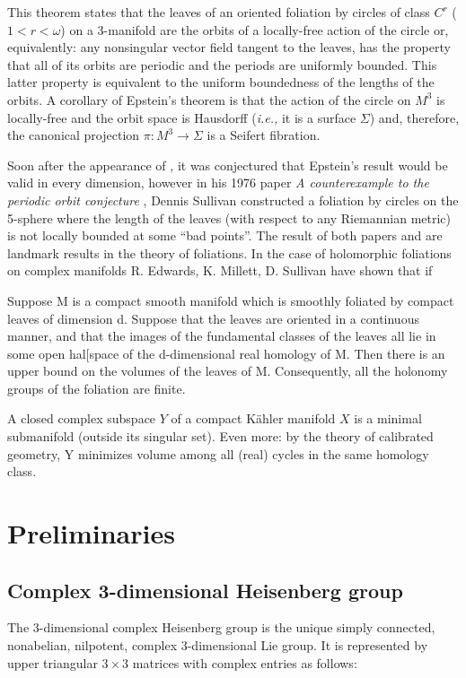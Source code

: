 \documentclass[A4paper,11pt]{amsart}
\newcommand{\ie}{{\em i.e.,\,\,}}
\theoremstyle{definition}
\theoremstyle{named}
\begin{document}
This theorem states that the leaves of an oriented foliation by circles of class $C^r$  ($1 < r < \omega$)  on a 3-manifold are the orbits of a
locally-free action of the circle or, equivalently: any nonsingular vector field tangent to the leaves,
has the property that all of its orbits are periodic and the periods are uniformly bounded. This latter property is equivalent to the uniform boundedness of the lengths of the orbits. A corollary of Epstein's theorem is that the action of the circle on $M^3$ is locally-free and the orbit space is Hausdorff (\ie it is a surface $\Sigma$) and, therefore, the canonical projection $\pi:M^3\to\Sigma$ is a Seifert fibration.

Soon after the appearance of \cite{Ep2}, it was conjectured that  Epstein's result would be valid in every dimension, however
in his 1976 paper {\em A counterexample to the periodic orbit conjecture} \cite{Su},
Dennis Sullivan constructed a foliation by circles on the 5-sphere where the length of the leaves (with respect to any Riemannian metric)  is not locally bounded at some ``bad points''.  The result of both papers \cite{Ep2} and \cite{Su} are landmark results in the theory of foliations. 
In the case of holomorphic foliations on complex manifolds R. Edwards, K. Millett, D. Sullivan \cite{EMS}
have shown that if

Suppose M is a compact smooth manifold which is smoothly foliated by compact leaves of dimension d. Suppose that the leaves are oriented in a continuous manner, and that the images of the fundamental classes of the leaves all lie in some open hal[space of the d-dimensional real homology of M. Then there is an upper bound on the volumes of the leaves of M. Consequently, all the holonomy groups of the foliation are finite.


A closed complex subspace $Y$ of a compact Kähler manifold $X$ is a minimal submanifold (outside its singular set).  Even more: by the theory of calibrated geometry, Y minimizes volume among all (real) cycles in the same homology class. 

\section{Preliminaries}
\subsection{Complex 3-dimensional Heisenberg group} The 3-dimensional complex Heisenberg group is the unique simply connected, nonabelian, nilpotent, complex 3-dimensional Lie group. It is represented by upper triangular  $3\times3$ matrices with complex entries as follows:
\end{document}
